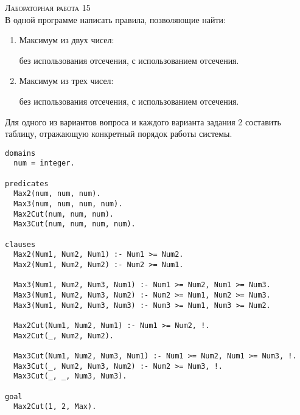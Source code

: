 \textsc{\huge Лабораторная работа 15} \\
В одной программе написать правила, позволяющие найти:
\begin{enumerate}[label=\arabic*.]
	\item Максимум из двух чисел: 
	\begin{tasks}[label=\asbuk*)]
			\task без использования отсечения,
			\task с использованием отсечения.
		\end{tasks}
	\item Максимум из трех чисел: 
	\begin{tasks}[label=\asbuk*)]
		\task без использования отсечения,
		\task с использованием отсечения.
	\end{tasks}
\end{enumerate}
Для одного из вариантов вопроса и каждого варианта задания 2 составить таблицу, отражающую конкретный порядок работы системы.
\begin{lstlisting}
domains
  num = integer.

predicates
  Max2(num, num, num).
  Max3(num, num, num, num).
  Max2Cut(num, num, num).
  Max3Cut(num, num, num, num).

clauses
  Max2(Num1, Num2, Num1) :- Num1 >= Num2.
  Max2(Num1, Num2, Num2) :- Num2 >= Num1.

  Max3(Num1, Num2, Num3, Num1) :- Num1 >= Num2, Num1 >= Num3.
  Max3(Num1, Num2, Num3, Num2) :- Num2 >= Num1, Num2 >= Num3.
  Max3(Num1, Num2, Num3, Num3) :- Num3 >= Num1, Num3 >= Num2.

  Max2Cut(Num1, Num2, Num1) :- Num1 >= Num2, !.
  Max2Cut(_, Num2, Num2).

  Max3Cut(Num1, Num2, Num3, Num1) :- Num1 >= Num2, Num1 >= Num3, !.
  Max3Cut(_, Num2, Num3, Num2) :- Num2 >= Num3, !.
  Max3Cut(_, _, Num3, Num3).

goal
  Max2Cut(1, 2, Max).
\end{lstlisting}
